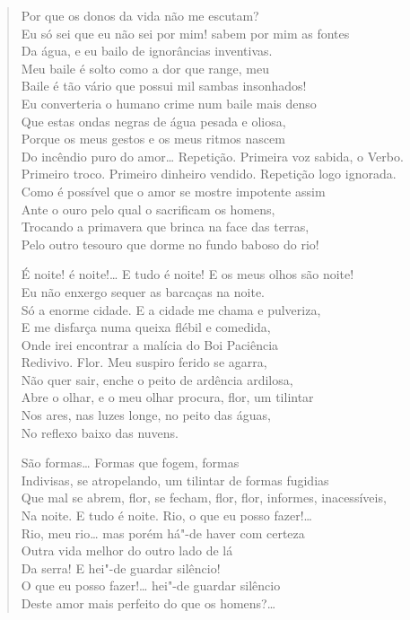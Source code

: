 \begin{verse}
Por que os donos da vida não me escutam?\\
Eu só sei que eu não sei por mim! sabem por mim as fontes\\
Da água, e eu bailo de ignorâncias inventivas.\\
Meu baile é solto como a dor que range, meu\\
Baile é tão vário que possui mil sambas insonhados!\\
Eu converteria o humano crime num baile mais denso\\
Que estas ondas negras de água pesada e oliosa,\\
Porque os meus gestos e os meus ritmos nascem\\
Do incêndio puro do amor\ldots{} Repetição. Primeira voz sabida, o Verbo.\\
Primeiro troco. Primeiro dinheiro vendido. Repetição logo ignorada.\\
Como é possível que o amor se mostre impotente assim\\
Ante o ouro pelo qual o sacrificam os homens,\\
Trocando a primavera que brinca na face das terras,\\
Pelo outro tesouro que dorme no fundo baboso do rio!

É noite! é noite!\ldots{} E tudo é noite! E os meus olhos são noite!\\
Eu não enxergo sequer as barcaças na noite.\\
Só a enorme cidade. E a cidade me chama e pulveriza,\\
E me disfarça numa queixa flébil e comedida,\\
Onde irei encontrar a malícia do Boi Paciência\\
Redivivo. Flor. Meu suspiro ferido se agarra,\\
Não quer sair, enche o peito de ardência ardilosa,\\
Abre o olhar, e o meu olhar procura, flor, um tilintar\\
Nos ares, nas luzes longe, no peito das águas,\\
No reflexo baixo das nuvens.

São formas\ldots{} Formas que fogem, formas\\
Indivisas, se atropelando, um tilintar de formas fugidias\\
Que mal se abrem, flor, se fecham, flor, flor, informes, inacessíveis,\\
Na noite. E tudo é noite. Rio, o que eu posso fazer!\ldots{}\\
Rio, meu rio\ldots{} mas porém há"-de haver com certeza\\
Outra vida melhor do outro lado de lá\\
Da serra! E hei"-de guardar silêncio!\\
O que eu posso fazer!\ldots{} hei"-de guardar silêncio\\
Deste amor mais perfeito do que os homens?\ldots{}


\end{verse}
